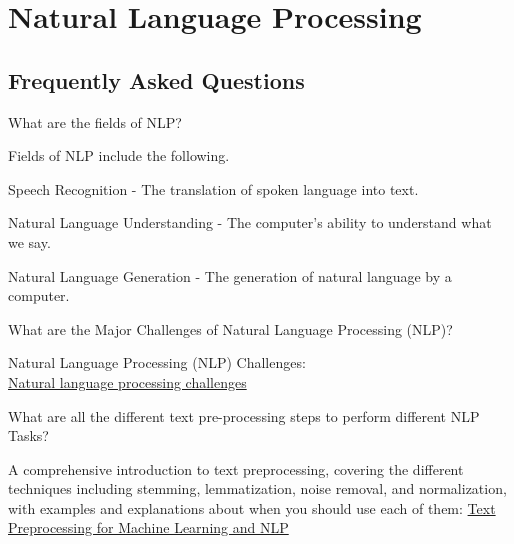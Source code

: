 	\chapter{Natural Language Processing}
	\section{Frequently Asked Questions}

	\resetquestioncounter{}
	\begin{qanda}
		\begin{question}
 What are the fields of NLP?
 		\end{question}
		\begin{answer}
Fields of NLP include the following.
			\begin{bulletedlist}
				\item Speech Recognition - The translation of spoken language into text.
				\item Natural Language Understanding - The computer's ability to understand what we say.
				\item Natural Language Generation - The generation of natural language by a computer.
			\end{bulletedlist}
		\end{answer}
	\end{qanda}

	\begin{qanda}
		\begin{question}
What are the Major Challenges of Natural Language Processing (NLP)?
		\end{question}
		\begin{answer}
Natural Language Processing (NLP) Challenges:\\
\href{https://monkeylearn.com/blog/natural-language-processing-challenges/}{Natural language processing challenges}
		\end{answer}
	\end{qanda}

	\begin{qanda}
		\begin{question}
What are all the different text pre-processing steps to perform different NLP Tasks?
		\end{question}
		\begin{answer}
A comprehensive introduction to text preprocessing, covering the different techniques including stemming, lemmatization, noise removal, and normalization, with examples and explanations about when you should use each of them:
\href{https://kavita-ganesan.com/text-preprocessing-tutorial/#.YtCThXbMImL}{Text Preprocessing for Machine Learning and NLP}
		\end{answer}
	\end{qanda}


